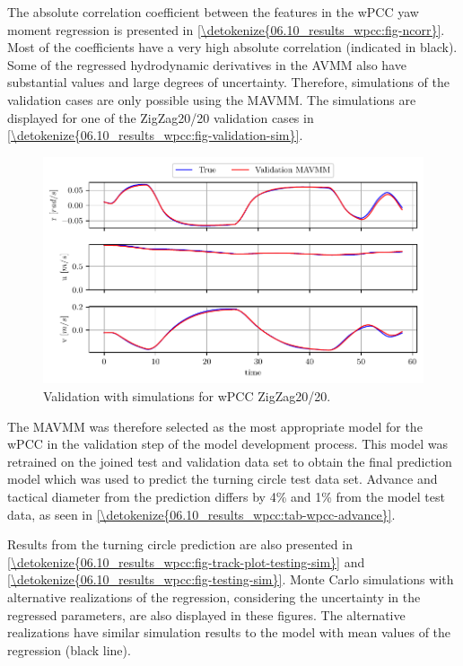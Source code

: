 \clearpage
The absolute correlation coefficient between the features in the wPCC yaw moment regression is presented in \hyperref[\detokenize{06.10_results_wpcc:fig-ncorr}]{\autoref{\detokenize{06.10_results_wpcc:fig-ncorr}}}. Most of the coefficients have a very high absolute correlation (indicated in black). Some of the regressed hydrodynamic derivatives in the AVMM also have substantial values and large degrees of uncertainty. Therefore, simulations of the validation cases are only possible using the MAVMM. The simulations are displayed for one of the ZigZag20/20 validation cases in \hyperref[\detokenize{06.10_results_wpcc:fig-validation-sim}]{\autoref{\detokenize{06.10_results_wpcc:fig-validation-sim}}}.
\begin{figure}[h!]
\centering
\includegraphics[width=1.0\textwidth]{kappa/images/9.pdf}
\caption{Validation with simulations for wPCC ZigZag20/20.}\label{\detokenize{06.10_results_wpcc:fig-validation-sim}}\end{figure}
The MAVMM was therefore selected as the most appropriate model for the wPCC in the validation step of the model development process. This model was retrained on the joined test and validation data set to obtain the final prediction model which was used to predict the turning circle test data set. Advance and tactical diameter \cite{imo_standards_2002} from the prediction differs by 4\% and 1\% from the model test data, as seen in \autoref{\detokenize{06.10_results_wpcc:tab-wpcc-advance}}.

Results from the turning circle prediction are also presented in  \autoref{\detokenize{06.10_results_wpcc:fig-track-plot-testing-sim}} and  \autoref{\detokenize{06.10_results_wpcc:fig-testing-sim}}. Monte Carlo simulations with alternative realizations of the regression, considering the uncertainty in the regressed parameters, are also displayed in these figures. The alternative realizations have similar simulation results to the model with mean values of the regression (black line).
